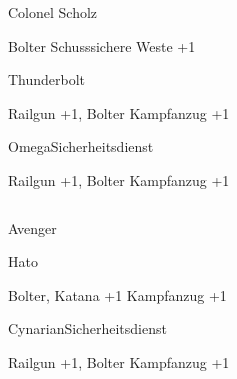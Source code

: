 \begin{column}[l]{0.45}
    \begin{nscsheet}[h]{Colonel Scholz}
        \nscstats[ATT=2,AGG=2,COM=3]
        \nscruler
        \begin{nscinventory}
            \nscitem[Waffen] Bolter
            \nscitem[R"ustung] Schusssichere Weste +1
        \end{nscinventory}
    \end{nscsheet}

    \begin{nscsheet}[h]{Thunderbolt}
        \nscstats[ATT=3,AGG=3,CON=2]
        \nscruler
        \begin{nscinventory}
            \nscitem[Waffen] Railgun +1, Bolter
            \nscitem[R"ustung] Kampfanzug +1
        \end{nscinventory}
    \end{nscsheet}

    \begin{nscsheet}[h]{Omega\newline{}Sicherheitsdienst}
        \nscstats[ATT=3,AGG=3,CON=2]
        \nscruler
        \begin{nscinventory}
            \nscitem[Waffen] Railgun +1, Bolter
            \nscitem[R"ustung] Kampfanzug +1
        \end{nscinventory}
    \end{nscsheet}    
\end{column}
\begin{column}[r]{0.45}
    \begin{nscsheet}[h]{Avenger}
        \nscstats[ATT=2,AGG=2,DEX=2,COM=3,CON=2]
        \nscruler
    \end{nscsheet}
    
    \begin{nscsheet}[h]{Hato}
        \nscstats[ATT=3,AGG=3,CON=2]
        \nscruler
        \begin{nscinventory}
            \nscitem[Waffen] Bolter, Katana +1
            \nscitem[R"ustung] Kampfanzug +1
        \end{nscinventory}
    \end{nscsheet}

    \begin{nscsheet}[h]{Cynarian\newline{}Sicherheitsdienst}
        \nscstats[ATT=2,AGG=2]
        \nscruler
        \begin{nscinventory}
            \nscitem[Waffen] Railgun +1, Bolter
            \nscitem[R"ustung] Kampfanzug +1        
        \end{nscinventory}
    \end{nscsheet}    
\end{column}
